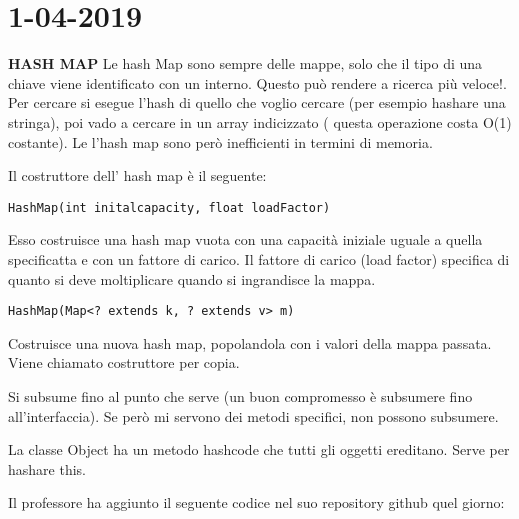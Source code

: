 

\newpage
\section{1-04-2019}
\textbf{HASH MAP} \newline
Le hash Map sono sempre delle mappe, solo che il tipo di una chiave viene identificato con un interno. Questo può rendere a ricerca più veloce!. \newline
Per cercare si esegue l'hash di quello che voglio cercare (per esempio hashare una stringa), poi vado a cercare in un array indicizzato ( questa operazione costa O(1) costante). \newline
Le l'hash map sono però inefficienti in termini di memoria. 

\noindent Il costruttore dell' hash map è il seguente: 
\begin{lstlisting}[basicstyle=\small,]
	HashMap(int initalcapacity, float loadFactor)
\end{lstlisting}
Esso costruisce una hash map vuota con una capacità iniziale uguale a quella specificatta e con un fattore di carico. Il fattore di carico (load factor) specifica di quanto si deve moltiplicare quando si ingrandisce la mappa. 
\begin{lstlisting}[basicstyle=\small,]
	HashMap(Map<? extends k, ? extends v> m)
\end{lstlisting}
Costruisce una nuova hash map, popolandola con i valori della mappa passata. Viene chiamato costruttore per copia.

\noindent Si subsume fino al punto che serve (un buon compromesso è subsumere fino all'interfaccia). Se però mi servono dei metodi specifici, non possono subsumere. 

\noindent La classe Object ha un metodo hashcode che tutti gli oggetti ereditano. Serve per hashare this.



\noindent Il professore ha aggiunto il seguente codice nel suo repository github quel giorno: 

